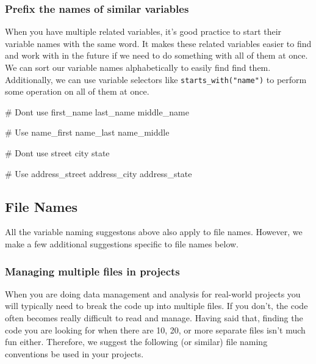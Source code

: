 \documentclass[
  letterpaper,
  DIV=11,
  numbers=noendperiod]{scrreprt}
\newenvironment{Shaded}{\begin{snugshade}}{\end{snugshade}}
\newcommand{\CommentTok}[1]{\textcolor[rgb]{0.37,0.37,0.37}{#1}}
\newcommand{\NormalTok}[1]{\textcolor[rgb]{0.00,0.23,0.31}{#1}}
\begin{document}
\subsubsection{Prefix the names of similar
variables}\label{prefix-the-names-of-similar-variables}

When you have multiple related variables, it's good practice to start
their variable names with the same word. It makes these related
variables easier to find and work with in the future if we need to do
something with all of them at once. We can sort our variable names
alphabetically to easily find find them. Additionally, we can use
variable selectors like \texttt{starts\_with("name")} to perform some
operation on all of them at once.

\begin{Shaded}
\begin{Highlighting}[]
\CommentTok{\# Don\textquotesingle{}t use}
\NormalTok{first\_name}
\NormalTok{last\_name}
\NormalTok{middle\_name}

\CommentTok{\# Use}
\NormalTok{name\_first}
\NormalTok{name\_last}
\NormalTok{name\_middle}

\CommentTok{\# Don\textquotesingle{}t use}
\NormalTok{street}
\NormalTok{city}
\NormalTok{state}

\CommentTok{\# Use}
\NormalTok{address\_street}
\NormalTok{address\_city}
\NormalTok{address\_state}
\end{Highlighting}
\end{Shaded}

\subsection{File Names}\label{file-names}

All the variable naming suggestons above also apply to file names.
However, we make a few additional suggestions specific to file names
below.

\subsubsection{Managing multiple files in
projects}\label{managing-multiple-files-in-projects}

When you are doing data management and analysis for real-world projects
you will typically need to break the code up into multiple files. If you
don't, the code often becomes really difficult to read and manage.
Having said that, finding the code you are looking for when there are
10, 20, or more separate files isn't much fun either. Therefore, we
suggest the following (or similar) file naming conventions be used in
your projects.
\end{document}

